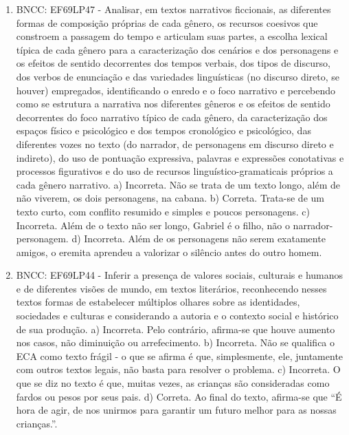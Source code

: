 \begin{enumerate}
\item
BNCC: EF69LP47 - Analisar, em textos narrativos ficcionais, as
diferentes formas de composição próprias de cada gênero, os recursos
coesivos que constroem a passagem do tempo e articulam suas partes, a
escolha lexical típica de cada gênero para a caracterização dos cenários
e dos personagens e os efeitos de sentido decorrentes dos tempos
verbais, dos tipos de discurso, dos verbos de enunciação e das
variedades linguísticas (no discurso direto, se houver) empregados,
identificando o enredo e o foco narrativo e percebendo como se estrutura
a narrativa nos diferentes gêneros e os efeitos de sentido decorrentes
do foco narrativo típico de cada gênero, da caracterização dos espaços
físico e psicológico e dos tempos cronológico e psicológico, das
diferentes vozes no texto (do narrador, de personagens em discurso
direto e indireto), do uso de pontuação expressiva, palavras e
expressões conotativas e processos figurativos e do uso de recursos
linguístico-gramaticais próprios a cada gênero narrativo.
 a) Incorreta. Não se trata de um texto longo, além de não viverem, os dois personagens, na cabana. b) Correta. Trata-se de um texto curto, com conflito resumido e simples e poucos personagens. c) Incorreta. Além de o texto não ser longo, Gabriel é o filho, não o narrador-personagem. d) Incorreta. Além de os personagens não serem exatamente amigos, o
eremita aprendeu a valorizar o silêncio antes do outro homem.

\item
BNCC: EF69LP44 - Inferir a presença de valores sociais, culturais e
humanos e de diferentes visões de mundo, em textos literários,
reconhecendo nesses textos formas de estabelecer múltiplos olhares sobre
as identidades, sociedades e culturas e considerando a autoria e o
contexto social e histórico de sua produção.
 a) Incorreta. Pelo contrário, afirma-se que houve aumento nos casos, não diminuição ou arrefecimento. b) Incorreta. Não se qualifica o ECA como texto frágil - o que se afirma é que, simplesmente, ele, juntamente com outros textos legais, não basta para resolver o problema. c) Incorreta. O que se diz no texto é que, muitas vezes, as crianças são consideradas como fardos ou pesos por seus pais. d) Correta. Ao final do texto, afirma-se que ``É hora de agir, de nos unirmos para garantir um futuro melhor para as nossas crianças.''.


\end{enumerate}

